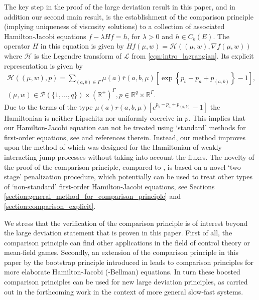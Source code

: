 \documentclass[a4paper]{article}
\newcommand{\cH}{\mathcal{H}}
\newcommand{\cL}{\mathcal{L}}
\newcommand{\cP}{\mathcal{P}}
\newcommand{\bR}{\mathbb{R}}
\numberwithin{equation}{section}
\theoremstyle{definition}
\begin{document}
The key step in the proof of the large deviation result in this paper, and in addition our second main result, is the establishment of the comparison principle (implying uniqueness of viscosity solutions) to a collection of associated Hamilton-Jacobi equations $f - \lambda Hf = h$, for $\lambda > 0$ and $h \in C_b(E)$. The operator $H$ in this equation is given by $Hf(\mu,w) = \cH((\mu,w),\nabla f(\mu,w))$ where $\cH$ is the Legendre transform of $\cL$ from \eqref{eqn:intro_lagrangian}. Its explicit representation is given by 
\begin{multline} \label{eqn:intro_Hamiltonian_difficult}
	\cH((\mu,w),p) = \sum_{(a,b) \in \Gamma} \mu(a) \overline{r}(a,b,\mu)\left[\exp\left\{p_b - p _a + p_{(a,b)} \right\} - 1 \right], \\
	(\mu,w) \in \cP(\{1,\dots,q\}) \times (\bR^+)^\Gamma, p \in \bR^{q} \times \bR^{\Gamma}.
\end{multline} 
Due to the terms of the type $\mu(a) r(a,b,\mu)\left[e^{p_b - p_a + p_{(a,b)}} - 1 \right]$ the Hamiltonian is neither Lipschitz nor uniformly coercive in $p$. This implies that our Hamilton-Jacobi equation can not be treated using `standard' methods for first-order equations, see \cite{FlSo06,BaCD97,CIL92} and references therein. Instead, our method improves upon the method of \cite{Kr16b} which was designed for the Hamiltonian of weakly interacting jump processes without taking into account the fluxes. The novelty of the proof of the comparison principle, compared to \cite{Kr16b}, is based on a novel `two stage' penalization procedure, which potentially can be used to treat other types of `non-standard' first-order Hamilton-Jacobi equations, see Sections \ref{section:general_method_for_comparison_principle} and \ref{section:comparison_explicit}.

We stress that the verification of the comparison principle is of interest beyond the large deviation statement that is proven in this paper. First of all, the comparison principle can find other applications in the field of control theory or mean-field games. Secondly, an extension of the comparison principle in this paper by the bootstrap principle introduced in \cite{KrSc19} leads to comparison principles for more elaborate Hamilton-Jacobi (-Bellman) equations. In turn these boosted comparison principles can be used for new large deviation principles, as carried out in the forthcoming work \cite{KrSchl20} in the context of more general slow-fast systems.
\end{document}
